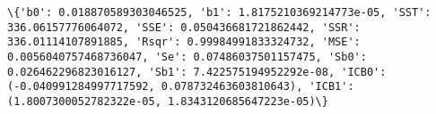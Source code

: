 \documentclass[11pt]{article}
\begin{document}
    \begin{Verbatim}[commandchars=\\\{\}]
\{'b0': 0.018870589303046525, 'b1': 1.8175210369214773e-05, 'SST': 336.06157776064072, 'SSE': 0.050436681721862442, 'SSR': 336.01114107891885, 'Rsqr': 0.99984991833324732, 'MSE': 0.0056040757468736047, 'Se': 0.07486037501157475, 'Sb0': 0.026462296823016127, 'Sb1': 7.422575194952292e-08, 'ICB0': (-0.040991284997717592, 0.078732463603810643), 'ICB1': (1.8007300052782322e-05, 1.8343120685647223e-05)\}

    \end{Verbatim}

    \begin{center}
    \end{center}
    { \hspace*{\fill} \\}
    
\end{document}
